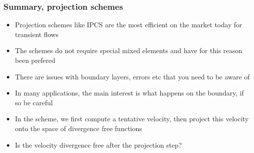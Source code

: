 \begin{frame}
\frametitle{Summary, projection schemes}
\begin{itemize}
\item Projection schemes like IPCS are the most efficient on the market today
for transient flows  
\item The schemes do not require special mixed elements and have 
      for this reason been prefered 
\item There are issues with boundary layers, errors etc that you need to be aware of
\item In many applications, the main interest is what happens on the boundary, if so be careful
\item In the scheme, we first compute a tentative velocity, then project this
velocity onto the space of divergence free functions  
\item Is the velocity divergence free after the projection step? 
\end{itemize}
\end{frame}

